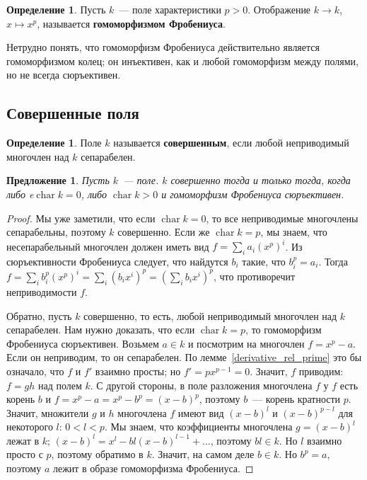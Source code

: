 \documentclass[a4paper,11pt]{scrartcl}
\theoremstyle{plain}
\newtheorem{proposition}[theorem]{Предложение}
\theoremstyle{definition}
\newtheorem{definition}[theorem]{Определение}
\newcommand\dfn[1]{\textbf{#1}}
\newcommand\cchar{\operatorname{char}}
\begin{document}
\begin{definition}
Пусть $k$~--- поле характеристики $p>0$. Отображение $k\to k$,
$x\mapsto x^p$, называется \dfn{гомоморфизмом Фробениуса}.
\end{definition}

Нетрудно понять, что гомоморфизм Фробениуса действительно является
гомоморфизмом колец; он инъективен, как и любой гомоморфизм между
полями, но не всегда сюръективен.

\subsection{Совершенные поля}

\begin{definition}
Поле $k$ называется \dfn{совершенным}, если любой неприводимый
многочлен над $k$ сепарабелен.
\end{definition}

\begin{proposition}
Пусть $k$~--- поле. $k$ совершенно тогда и только тогда, когда либо
e$\cchar k=0$, либо $\cchar k>0$ и гомоморфизм Фробениуса сюръективен.
\end{proposition}
\begin{proof}
Мы уже заметили, что если $\cchar k=0$, то все неприводимые многочлены
сепарабельны, поэтому $k$ совершенно. Если же $\cchar k=p$, мы знаем,
что несепарабельный многочлен должен иметь вид $f=\sum_i
a_i(x^p)^i$. Из сюръективности Фробениуса следует, что найдутся $b_i$
такие, что $b_i^p=a_i$. Тогда
$f = \sum_i b_i^p(x^p)^i = \sum_i(b_ix^i)^p=(\sum_i b_ix^i)^p$, что
противоречит неприводимости $f$.

Обратно, пусть $k$ совершенно, то есть, любой неприводимый многочлен
над $k$ сепарабелен. Нам нужно доказать, что если $\cchar k=p$, то
гомоморфизм Фробениуса сюръективен. Возьмем $a\in k$ и посмотрим на
многочлен $f=x^p-a$. Если он неприводим, то он сепарабелен. По
лемме~\ref{derivative_rel_prime} это бы означало, что $f$ и $f'$
взаимно просты; но $f'=px^{p-1}=0$. Значит, $f$ приводим: $f=gh$ над
полем $k$. С другой
стороны, в поле разложения многочлена $f$ у $f$ есть корень $b$ и
$f=x^p-a=x^p-b^p=(x-b)^p$, поэтому $b$~--- корень кратности
$p$. Значит, множители $g$ и $h$ многочлена $f$ имеют вид $(x-b)^l$ и
$(x-b)^{p-l}$ для некоторого $l$: $0<l<p$. Мы знаем, что коэффициенты
многочлена $g=(x-b)^l$ лежат в $k$; $(x-b)^l=x^l-bl(x-b)^{l-1}+\dots$,
поэтому $bl\in k$. Но $l$ взаимно просто с $p$, поэтому обратимо в
$k$. Значит, на самом деле $b\in k$. Но $b^p=a$, поэтому $a$ лежит в
образе гомоморфизма Фробениуса.
\end{proof}
\end{document}
